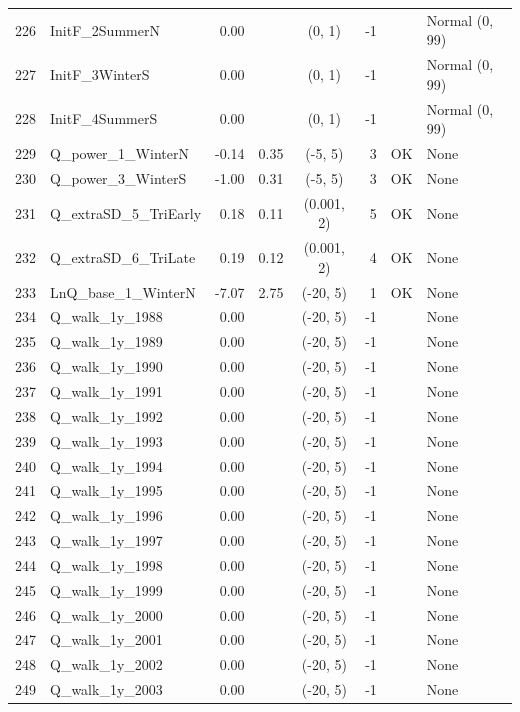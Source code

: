 \documentclass[12pt,]{article}
\begin{document}
\begin{landscape}
\begin{longtable}{rlrrcrcl}
  226 & InitF\_2SummerN & 0.00 &  & (0, 1) & -1 &  & Normal (0, 99) \\ 
  227 & InitF\_3WinterS & 0.00 &  & (0, 1) & -1 &  & Normal (0, 99) \\ 
  228 & InitF\_4SummerS & 0.00 &  & (0, 1) & -1 &  & Normal (0, 99) \\ 
  229 & Q\_power\_1\_WinterN & -0.14 & 0.35 & (-5, 5) & 3 & OK & None \\ 
  230 & Q\_power\_3\_WinterS & -1.00 & 0.31 & (-5, 5) & 3 & OK & None \\ 
  231 & Q\_extraSD\_5\_TriEarly & 0.18 & 0.11 & (0.001, 2) & 5 & OK & None \\ 
  232 & Q\_extraSD\_6\_TriLate & 0.19 & 0.12 & (0.001, 2) & 4 & OK & None \\ 
  233 & LnQ\_base\_1\_WinterN & -7.07 & 2.75 & (-20, 5) & 1 & OK & None \\ 
  234 & Q\_walk\_1y\_1988 & 0.00 &  & (-20, 5) & -1 &  & None \\ 
  235 & Q\_walk\_1y\_1989 & 0.00 &  & (-20, 5) & -1 &  & None \\ 
  236 & Q\_walk\_1y\_1990 & 0.00 &  & (-20, 5) & -1 &  & None \\ 
  237 & Q\_walk\_1y\_1991 & 0.00 &  & (-20, 5) & -1 &  & None \\ 
  238 & Q\_walk\_1y\_1992 & 0.00 &  & (-20, 5) & -1 &  & None \\ 
  239 & Q\_walk\_1y\_1993 & 0.00 &  & (-20, 5) & -1 &  & None \\ 
  240 & Q\_walk\_1y\_1994 & 0.00 &  & (-20, 5) & -1 &  & None \\ 
  241 & Q\_walk\_1y\_1995 & 0.00 &  & (-20, 5) & -1 &  & None \\ 
  242 & Q\_walk\_1y\_1996 & 0.00 &  & (-20, 5) & -1 &  & None \\ 
  243 & Q\_walk\_1y\_1997 & 0.00 &  & (-20, 5) & -1 &  & None \\ 
  244 & Q\_walk\_1y\_1998 & 0.00 &  & (-20, 5) & -1 &  & None \\ 
  245 & Q\_walk\_1y\_1999 & 0.00 &  & (-20, 5) & -1 &  & None \\ 
  246 & Q\_walk\_1y\_2000 & 0.00 &  & (-20, 5) & -1 &  & None \\ 
  247 & Q\_walk\_1y\_2001 & 0.00 &  & (-20, 5) & -1 &  & None \\ 
  248 & Q\_walk\_1y\_2002 & 0.00 &  & (-20, 5) & -1 &  & None \\ 
  249 & Q\_walk\_1y\_2003 & 0.00 &  & (-20, 5) & -1 &  & None \\ 

\end{longtable}
\end{landscape}
\end{document}
